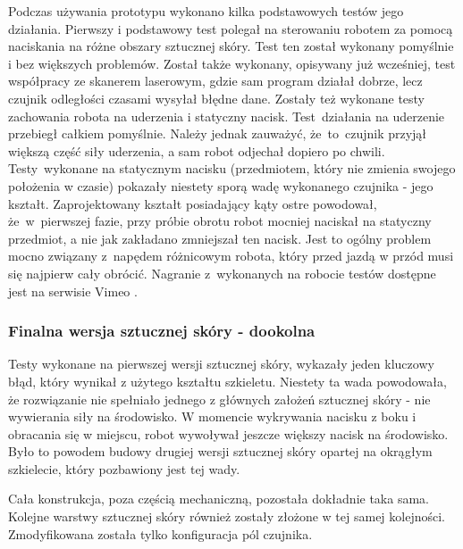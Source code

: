 Podczas używania prototypu wykonano kilka podstawowych testów jego działania. Pierwszy i podstawowy test polegał na sterowaniu robotem za pomocą naciskania na różne obszary sztucznej skóry. Test ten został wykonany pomyślnie i bez większych problemów. Został także wykonany, opisywany już wcześniej, test współpracy ze skanerem laserowym, gdzie sam program działał dobrze, lecz czujnik odległości czasami wysyłał błędne dane. Zostały też wykonane testy zachowania robota na uderzenia i statyczny nacisk. Test~działania na uderzenie przebiegł całkiem pomyślnie. Należy jednak zauważyć, że~to~czujnik przyjął większą część siły uderzenia, a sam robot odjechał dopiero po chwili. Testy~wykonane na statycznym nacisku (przedmiotem, który nie zmienia swojego położenia w czasie) pokazały niestety sporą wadę wykonanego czujnika - jego kształt. Zaprojektowany kształt posiadający kąty ostre powodował, że~w~pierwszej fazie, przy próbie obrotu robot mocniej naciskał na statyczny przedmiot, a nie jak zakładano zmniejszał ten nacisk. Jest to ogólny problem mocno związany z~napędem różnicowym robota, który przed jazdą w przód musi się najpierw cały obrócić. Nagranie z~wykonanych na robocie testów dostępne jest na serwisie Vimeo \cite{b_site_vimeo_kwadrat}.

\subsubsection{Finalna wersja sztucznej skóry - dookolna}

Testy wykonane na pierwszej wersji sztucznej skóry, wykazały jeden kluczowy błąd, który wynikał z użytego kształtu szkieletu. Niestety ta wada powodowała, że rozwiązanie nie spełniało jednego z głównych założeń sztucznej skóry - nie wywierania siły na środowisko. W momencie wykrywania nacisku z boku i obracania się w miejscu, robot wywoływał jeszcze większy nacisk na środowisko. Było to powodem budowy drugiej wersji sztucznej skóry opartej na okrągłym szkielecie, który pozbawiony jest tej wady.

Cała konstrukcja, poza częścią mechaniczną, pozostała dokładnie taka sama. Kolejne warstwy sztucznej skóry również zostały złożone w tej samej kolejności. Zmodyfikowana została tylko konfiguracja pól czujnika. 

